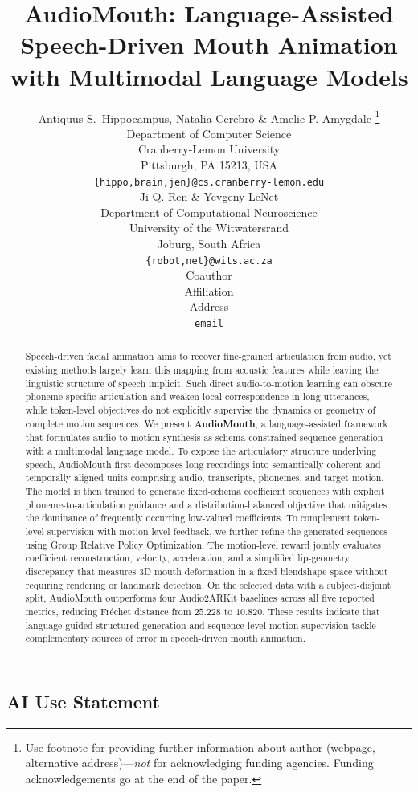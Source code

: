 \documentclass{article} %
\title{AudioMouth: Language-Assisted Speech-Driven Mouth Animation with Multimodal Language Models}
\author{Antiquus S.~Hippocampus, Natalia Cerebro \& Amelie P. Amygdale \thanks{ Use footnote for providing further information
about author (webpage, alternative address)---\emph{not} for acknowledging
funding agencies.  Funding acknowledgements go at the end of the paper.} \\
Department of Computer Science\\
Cranberry-Lemon University\\
Pittsburgh, PA 15213, USA \\
\texttt{\{hippo,brain,jen\}@cs.cranberry-lemon.edu} \\
\And
Ji Q. Ren \& Yevgeny LeNet \\
Department of Computational Neuroscience \\
University of the Witwatersrand \\
Joburg, South Africa \\
\texttt{\{robot,net\}@wits.ac.za} \\
\AND
Coauthor \\
Affiliation \\
Address \\
\texttt{email}
}
\begin{document}
\maketitle

\begin{abstract}
Speech-driven facial animation aims to recover fine-grained articulation from audio, yet existing methods largely learn this mapping 
from acoustic features while leaving the linguistic structure of speech implicit. Such direct audio-to-motion learning can obscure 
phoneme-specific articulation and weaken local correspondence in long utterances, while token-level objectives do not explicitly 
supervise the dynamics or geometry of complete motion sequences.
We present \textbf{AudioMouth}, a language-assisted framework that formulates audio-to-motion synthesis as schema-constrained sequence 
generation with a multimodal language model.  
To expose the articulatory structure underlying speech, AudioMouth first decomposes 
long recordings into semantically coherent and temporally aligned units comprising audio, transcripts, phonemes, and target motion.
The model is then trained to generate fixed-schema coefficient sequences with explicit phoneme-to-articulation guidance and a 
distribution-balanced objective that mitigates the dominance of frequently occurring low-valued coefficients.
To complement token-level supervision with motion-level feedback, we further refine the generated 
sequences using Group Relative Policy Optimization. The motion-level reward jointly evaluates coefficient reconstruction, 
velocity, acceleration, and a simplified lip-geometry discrepancy that measures 3D mouth deformation in a fixed blendshape 
space without requiring rendering or landmark detection.
On the selected data with a subject-disjoint split, AudioMouth outperforms four Audio2ARKit baselines across all five reported metrics,
reducing Fr\'echet distance from $25.228$ to $10.820$. These results indicate that language-guided structured generation and sequence-level motion
supervision tackle complementary sources of error in speech-driven mouth animation.
\end{abstract}

  




\newpage
\subsection*{AI Use Statement}
\end{document}
